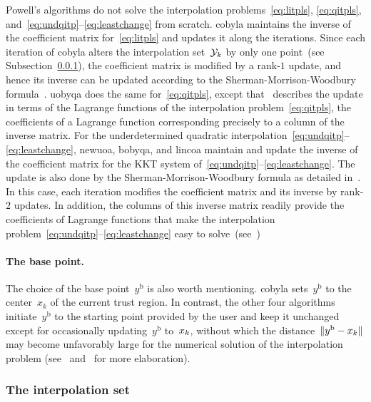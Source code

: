 \documentclass[
    smallextended,  %
    final,          %
]{svjour3}
\newcommand{\base}{{\text{b}}}
\newcommand{\iter}[1][k]{x\ifthenelse{\equal{#1}{}}{}{_{#1}}}
\newcommand{\xpt}[1][k]{\mathcal{Y}\ifthenelse{\equal{#1}{}}{}{_{#1}}}
\begin{document}
Powell's algorithms do not solve the interpolation problems~\eqref{eq:litpls}, \eqref{eq:qitpls},
and~\mbox{\eqref{eq:undqitp}--\eqref{eq:leastchange}} from scratch.
\gls{cobyla} maintains the inverse of the coefficient matrix for~\eqref{eq:litpls}
and updates it along the iterations.
Since each iteration of \gls{cobyla} alters the interpolation set~$\xpt$ by only one
point~(see Subsection~\ref{ssec:iptset}), the coefficient matrix is modified by a rank-$1$ update, and hence
its inverse can be updated according to the Sherman-Morrison-Woodbury formula~\cite{Hager_1989}.
\gls{uobyqa} does the same for~\eqref{eq:qitpls},
except that~\cite[\S~4]{Powell_2002} describes the update in terms of the Lagrange functions of the
interpolation problem~\eqref{eq:qitpls}, the coefficients of a Lagrange function corresponding
precisely to a column of the inverse matrix.
For the underdetermined quadratic interpolation~\mbox{\eqref{eq:undqitp}--\eqref{eq:leastchange}},
\gls{newuoa}, \gls{bobyqa}, and \gls{lincoa}
maintain and update the inverse of the coefficient matrix for the KKT system
of~\mbox{\eqref{eq:undqitp}--\eqref{eq:leastchange}}. The update is also done by the
Sherman-Morrison-Woodbury formula as detailed in~\cite[\S~2]{Powell_2004c}. In this case, each
iteration modifies the coefficient matrix and its inverse by rank-$2$ updates.
In addition, the columns of this inverse matrix readily provide the coefficients of Lagrange
functions that make the interpolation problem~\mbox{\eqref{eq:undqitp}--\eqref{eq:leastchange}}
easy to solve~(see~\mbox{\cite[\S~3]{Powell_2004b}})


\paragraph{\textnormal{\textbf{The base point.}}}

The choice of the base point~$y^{\base}$ is also worth mentioning.
\Gls{cobyla} sets~$y^{\base}$ to the center~$x_k$ of the current trust region.
In contrast, the other four algorithms initiate~$y^{\base}$ to the starting point provided by the
user and keep it unchanged except for occasionally updating~$y^{\base}$ to~$\iter$, without which
the distance~$\|y^{\base}-\iter\|$ may become unfavorably large for the numerical solution of the
interpolation problem (see~\cite[\S~5]{Powell_2004b} and~\cite[\S~7]{Powell_2006} for more elaboration).

\subsubsection{The interpolation set}
\label{ssec:iptset}
\end{document}
